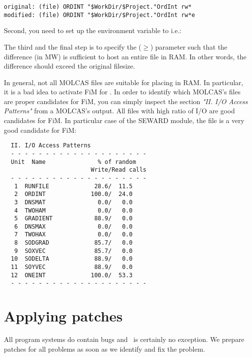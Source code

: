 \begin{verbatim}
original: (file) ORDINT "$WorkDir/$Project."OrdInt rw*
modified: (file) ORDINT "$WorkDir/$Project."OrdInt rw*e
\end{verbatim}

Second, you need to set up the  environment variable to 
i.e.:


The third and the final step is to specify the  ($\ge$) parameter such that the
 difference (in MW) is sufficient to host an entire
file in RAM. In other words, the  difference should
exceed the original filesize.

In general, not all MOLCAS files are suitable for placing in RAM. In
particular, it is a bad idea to activate FiM for . In order to
identify which MOLCAS's files are proper candidates for FiM, you can simply
inspect the section \textit{"II. I/O Access Patterns"} from a MOLCAS's output.
All files with high ratio of I/O  are good candidates for
FiM. In particular case of the SEWARD module, the  file is
a very good candidate for FiM:

\begin{verbatim}
  II. I/O Access Patterns
  - - - - - - - - - - - - - - - - - - - -
  Unit  Name               % of random
                         Write/Read calls
  - - - - - - - - - - - - - - - - - - - -
   1  RUNFILE             28.6/  11.5
   2  ORDINT             100.0/  24.0
   3  DNSMAT               0.0/   0.0
   4  TWOHAM               0.0/   0.0
   5  GRADIENT            88.9/   0.0
   6  DNSMAX               0.0/   0.0
   7  TWOHAX               0.0/   0.0
   8  SODGRAD             85.7/   0.0
   9  SOXVEC              85.7/   0.0
  10  SODELTA             88.9/   0.0
  11  SOYVEC              88.9/   0.0
  12  ONEINT             100.0/  53.3
  - - - - - - - - - - - - - - - - - - - -
\end{verbatim}

\section{Applying patches}

All program systems do contain bugs and \molcas\ is certainly no exception.
We prepare patches for all problems as soon as we identify and fix the
problem. 


